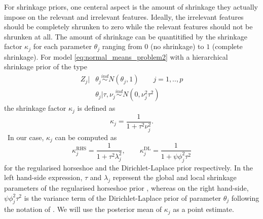 \documentclass[american,]{article}
\theoremstyle{definition}
\begin{document}
For shrinkage priors, one centeral aspect is the amount of shrinkage they actually impose on the relevant and irrelevant features. Ideally, the irrelevant features should be completely shrunken to zero while the relevant features should not be shrunken at all. The amount of shrinkage can be quantitified by the shrinkage factor $\kappa_{j}$ for each parameter $\theta_{j}$ ranging from $0$ (no shrinkage) to $1$ (complete shrinkage). For model \eqref{eq:normal_means_problem2} with a hierarchical shrinkage prior of the type
\begin{align}
Z_{j}|&\theta_{j}\overset{ind}{\sim}N(\theta_{j},1) \qquad j=1,..,p \\
&\theta_{j}|\tau,\nu_{j}\overset{ind}{\sim}N(0,\nu_{j}^{2}\tau^{2})
\end{align}
the shrinkage factor $\kappa_{j}$ is defined as
\begin{equation}
\kappa_{j}=\frac{1}{1+\tau^{2}\nu_{j}^{2}}.
\end{equation}
\
In our case, $\kappa_{j}$ can be computed as
\begin{equation}
\kappa_{j}^{\text{RHS}}=\frac{1}{1+\tau^{2}\lambda_{j}^{2}}, \qquad \kappa_{j}^{\text{DL}}=\frac{1}{1+\psi\phi_{j}^{2}\tau^{2}}
\end{equation}
for the regularised horseshoe and the Dirichlet-Laplace prior respectively. In the left hand-side expression, $\tau$ and $\lambda_{j}$ represent the global and local shrinkage parameters of the regularised horseshoe prior \cite[for further details see][]{paper:rhs}, whereas on the right hand-side, $\psi\phi_{j}^{2}\tau^{2}$ is the variance term of the Dirichlet-Laplace prior of parameter $\theta_{j}$ following the notation of \cite{paper:dirichlet_laplace}. We will use the posterior mean of $\kappa_{j}$ as a point estimate.
\end{document}
